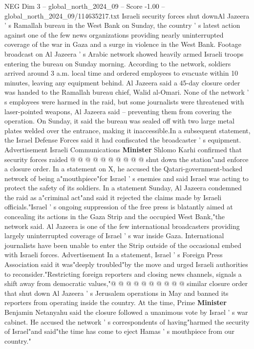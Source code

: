 \begin{textsample}{NEG Dim 3 – global\_north\_2024\_09 – Score -1.00 – global\_north\_2024\_09/114635217.txt}  \label{ex:f3_neg_298}
Israeli security forces shut downAl Jazeera ' s Ramallah bureau in the West Bank on Sunday, the country ' s latest action against one of the few news organizations providing nearly uninterrupted coverage of the war in Gaza and a surge in violence in the West Bank.
Footage broadcast on Al Jazeera ' s Arabic network showed heavily armed Israeli troops entering the bureau on Sunday morning.
According to the network, soldiers arrived around 3 a.m. local time and ordered employees to evacuate within 10 minutes, leaving any equipment behind.
Al Jazeera said a 45-day closure order was handed to the Ramallah bureau chief, Walid al-Omari.
None of the network ' s employees were harmed in the raid, but some journalists were threatened with laser-pointed weapons, Al Jazeera said -- preventing them from covering the operation.
On Sunday, it said the bureau was sealed off with two large metal plates welded over the entrance, making it inaccessible.In a subsequent statement, the Israel Defense Forces said it had confiscated the broadcaster ' s equipment.
Advertisement Israeli Communications \textbf{Minister} Shlomo Karhi confirmed that security forces raided @ @ @ @ @ @ @ @ @ @ shut down the station"and enforce a closure order.
In a statement on X, he accused the Qatari-government-backed network of being a"mouthpiece"for Israel ' s enemies and said Israel was acting to protect the safety of its soldiers.
In a statement Sunday, Al Jazeera condemned the raid as a"criminal act"and said it rejected the claims made by Israeli officials."Israel ' s ongoing suppression of the free press is blatantly aimed at concealing its actions in the Gaza Strip and the occupied West Bank,"the network said.
Al Jazeera is one of the few international broadcasters providing largely uninterrupted coverage of Israel ' s war inside Gaza.
International journalists have been unable to enter the Strip outside of the occasional embed with Israeli forces.
Advertisement In a statement, Israel ' s Foreign Press Association said it was"deeply troubled"by the move and urged Israeli authorities to reconsider."Restricting foreign reporters and closing news channels, signals a shift away from democratic values,"@ @ @ @ @ @ @ @ @ @ similar closure order that shut down Al Jazeera ' s Jerusalem operations in May and banned its reporters from operating inside the country.
At the time, Prime \textbf{Minister} Benjamin Netanyahu said the closure followed a unanimous vote by Israel ' s war cabinet.
He accused the network ' s correspondents of having"harmed the security of Israel"and said"the time has come to eject Hamas ' s mouthpiece from our country."

\end{textsample}

